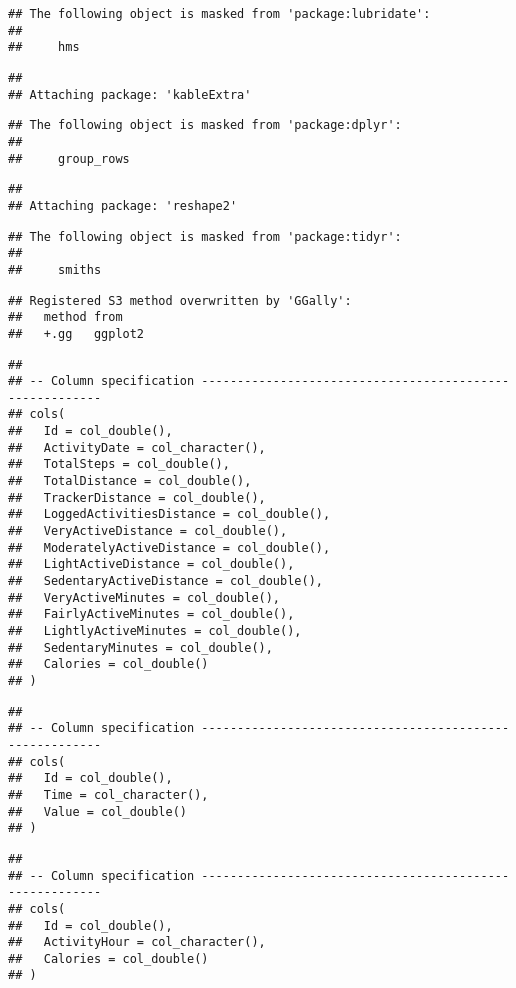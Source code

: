 \documentclass[
]{article}
\begin{document}
\begin{verbatim}
## The following object is masked from 'package:lubridate':
## 
##     hms
\end{verbatim}

\begin{verbatim}
## 
## Attaching package: 'kableExtra'
\end{verbatim}

\begin{verbatim}
## The following object is masked from 'package:dplyr':
## 
##     group_rows
\end{verbatim}

\begin{verbatim}
## 
## Attaching package: 'reshape2'
\end{verbatim}

\begin{verbatim}
## The following object is masked from 'package:tidyr':
## 
##     smiths
\end{verbatim}

\begin{verbatim}
## Registered S3 method overwritten by 'GGally':
##   method from   
##   +.gg   ggplot2
\end{verbatim}

\begin{verbatim}
## 
## -- Column specification --------------------------------------------------------
## cols(
##   Id = col_double(),
##   ActivityDate = col_character(),
##   TotalSteps = col_double(),
##   TotalDistance = col_double(),
##   TrackerDistance = col_double(),
##   LoggedActivitiesDistance = col_double(),
##   VeryActiveDistance = col_double(),
##   ModeratelyActiveDistance = col_double(),
##   LightActiveDistance = col_double(),
##   SedentaryActiveDistance = col_double(),
##   VeryActiveMinutes = col_double(),
##   FairlyActiveMinutes = col_double(),
##   LightlyActiveMinutes = col_double(),
##   SedentaryMinutes = col_double(),
##   Calories = col_double()
## )
\end{verbatim}

\begin{verbatim}
## 
## -- Column specification --------------------------------------------------------
## cols(
##   Id = col_double(),
##   Time = col_character(),
##   Value = col_double()
## )
\end{verbatim}

\begin{verbatim}
## 
## -- Column specification --------------------------------------------------------
## cols(
##   Id = col_double(),
##   ActivityHour = col_character(),
##   Calories = col_double()
## )
\end{verbatim}
\end{document}
